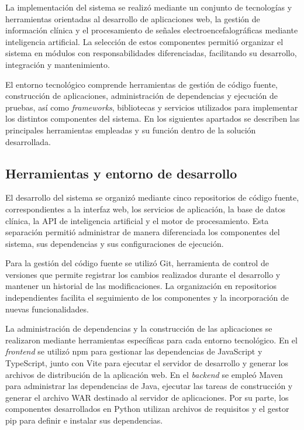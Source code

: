 La implementación del sistema se realizó mediante un conjunto de tecnologías y herramientas orientadas al desarrollo de aplicaciones web, la gestión de información clínica y el procesamiento de señales electroencefalográficas mediante inteligencia artificial. La selección de estos componentes permitió organizar el sistema en módulos con responsabilidades diferenciadas, facilitando su desarrollo, integración y mantenimiento.

El entorno tecnológico comprende herramientas de gestión de código fuente, construcción de aplicaciones, administración de dependencias y ejecución de pruebas, así como \textit{frameworks}, bibliotecas y servicios utilizados para implementar los distintos componentes del sistema. En los siguientes apartados se describen las principales herramientas empleadas y su función dentro de la solución desarrollada.

\subsection{Herramientas y entorno de desarrollo}
\label{herramientas-entorno-desarrollo}

El desarrollo del sistema se organizó mediante cinco repositorios de código fuente, correspondientes a la interfaz web, los servicios de aplicación, la base de datos clínica, la API de inteligencia artificial y el motor de procesamiento. Esta separación permitió administrar de manera diferenciada los componentes del sistema, sus dependencias y sus configuraciones de ejecución.

Para la gestión del código fuente se utilizó Git, herramienta de control de versiones que permite registrar los cambios realizados durante el desarrollo y mantener un historial de las modificaciones. La organización en repositorios independientes facilita el seguimiento de los componentes y la incorporación de nuevas funcionalidades.

La administración de dependencias y la construcción de las aplicaciones se realizaron mediante herramientas específicas para cada entorno tecnológico. En el \textit{frontend} se utilizó npm para gestionar las dependencias de JavaScript y TypeScript, junto con Vite para ejecutar el servidor de desarrollo y generar los archivos de distribución de la aplicación web. En el \textit{backend} se empleó Maven para administrar las dependencias de Java, ejecutar las tareas de construcción y generar el archivo WAR destinado al servidor de aplicaciones. Por su parte, los componentes desarrollados en Python utilizan archivos de requisitos y el gestor pip para definir e instalar sus dependencias.

